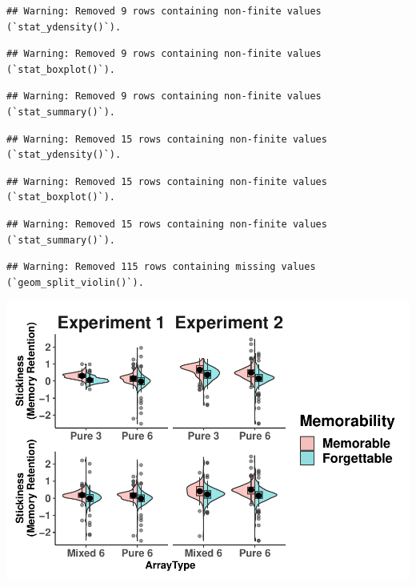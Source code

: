 \documentclass[
  man]{apa6}
\begin{document}
\begin{verbatim}
## Warning: Removed 9 rows containing non-finite values (`stat_ydensity()`).
\end{verbatim}

\begin{verbatim}
## Warning: Removed 9 rows containing non-finite values (`stat_boxplot()`).
\end{verbatim}

\begin{verbatim}
## Warning: Removed 9 rows containing non-finite values (`stat_summary()`).
\end{verbatim}

\begin{verbatim}
## Warning: Removed 15 rows containing non-finite values (`stat_ydensity()`).
\end{verbatim}

\begin{verbatim}
## Warning: Removed 15 rows containing non-finite values (`stat_boxplot()`).
\end{verbatim}

\begin{verbatim}
## Warning: Removed 15 rows containing non-finite values (`stat_summary()`).
\end{verbatim}

\begin{verbatim}
## Warning: Removed 115 rows containing missing values (`geom_split_violin()`).
\end{verbatim}

\includegraphics{Script_Re_Greer_2023_group1Rock_2023_files/figure-latex/unnamed-chunk-17-1.pdf}
\end{document}
